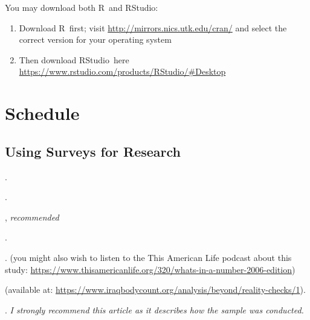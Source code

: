 \documentclass[11pt]{syllabus}
\newcommand{\R}{\textsf{R}}
\newcommand{\RStudio}{\textsf{RStudio}}
\begin{document}
You may download both \R\ and \RStudio: 
\begin{enumerate}
\item Download \R\ first; visit \url{http://mirrors.nics.utk.edu/cran/} and select the correct version for your operating system
\item Then download \RStudio\ here \url{https://www.rstudio.com/products/RStudio/#Desktop}
\end{enumerate}

\section{Schedule}

\subsection{Using Surveys for Research}
\begin{readings}
\item {}.
\end{readings}

\begin{readings}
\item {}. 
\item {}
\item {}, \textit{recommended}
\end{readings}

\begin{readings}
\item {}. 
\item {}. (you might also wish to listen to the This American Life podcast about this study: \url{https://www.thisamericanlife.org/320/whats-in-a-number-2006-edition})
\item {} (available at: \url{https://www.iraqbodycount.org/analysis/beyond/reality-checks/1}).
\item {}. \textit{I strongly recommend this article as it describes how the sample was conducted.}
\end{readings}
\end{document}
